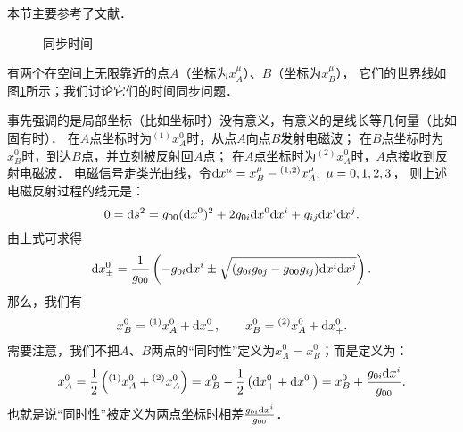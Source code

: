 本节主要参考了文献\parencite[\S 84]{landau_2-classical-fields}．

\begin{figure}[htb]
    \centering
    \caption{同步时间}\label{chfd:pic_syn-time}
\end{figure}


有两个在空间上无限靠近的点$A$（坐标为$x^\mu_A$）、$B$（坐标为$x^\mu_B$），
它们的世界线如图\ref{chfd:pic_syn-time}所示；我们讨论它们的时间同步问题．

事先强调的是局部坐标（比如坐标时）没有意义，有意义的是线长等几何量（比如固有时）．
在$A$点坐标时为${}^{(1)}x_A^0$时，从点$A$向点$B$发射电磁波；
在$B$点坐标时为$x_B^0$时，到达$B$点，并立刻被反射回$A$点；
在$A$点坐标时为${}^{(2)}x_A^0$时，$A$点接收到反射电磁波．
电磁信号走类光曲线，令${\rm d} x^\mu = x_B^\mu-{}^{(1,2)}x_A^\mu,\  \mu=0,1,2,3$，
则上述电磁反射过程的线元是：
\begin{equation}
    0 = {\rm d}s^2 = g_{00} ({\rm d}x^0)^2 + 2 g_{0i}{\rm d}x^0 {\rm d}x^i
    + g_{ij} {\rm d}x^i {\rm d}x^j .
\end{equation}
由上式可求得
\begin{equation}
    {\rm d}x^0_{\pm} = \frac{1}{g_{00}}\left( - g_{0i}{\rm d}x^i \pm
    \sqrt{(g_{0i}g_{0j}-g_{00}g_{ij}){\rm d}x^i {\rm d}x^j}\right).
\end{equation}
那么，我们有
\begin{equation}
    x^0_B = {}^{(1)}x_A^0 + {\rm d}x^0_{-} , \qquad
    x^0_B = {}^{(2)}x_A^0 + {\rm d}x^0_{+} .
\end{equation}
需要注意，我们不把$A$、$B$两点的“同时性”定义为$x_A^0=x_B^0$；而是定义为：
\begin{equation}
    x_A^0= \frac{1}{2}\left( {}^{(1)}x_A^0 + {}^{(2)}x_A^0 \right)
    =x^0_B-\frac{1}{2}\left( {\rm d}x^0_{+} + {\rm d}x^0_{-} \right)
    =x^0_B+\frac{g_{0i}{\rm d}x^i}{g_{00}}.
\end{equation}
也就是说“同时性”被定义为两点坐标时相差$\frac{g_{0i}{\rm d}x^i}{g_{00}}$．

